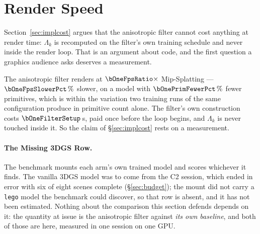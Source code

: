 \section{Render Speed}
\label{sec:fps}

Section~\ref{sec:implcost} argues that the anisotropic filter cannot cost anything at render time:
$\Lambda_k$ is recomputed on the filter's own training schedule and never inside
the render loop. That is an argument about code, and the first question a
graphics audience asks deserves a measurement.



The anisotropic filter renders at $\bOneFpsRatio\times$ Mip-Splatting --- $\bOneFpsSlowerPct\,\%$
slower, on a model with $\bOnePrimFewerPct\,\%$ fewer primitives, which is
within the variation two training runs of the same configuration produce in
primitive count alone. The filter's own construction costs $\bOneFilterSetup$\,s,
paid once before the loop begins, and $\Lambda_k$
is never touched inside it. So the claim of \S\ref{sec:implcost} rests on a measurement.

\paragraph{The Missing 3DGS Row.} The benchmark mounts each arm's own
trained model and scores whichever it finds. The vanilla 3DGS model was to come from the C2 session, which ended in error with six of eight scenes complete
(\S\ref{sec:budget}); the mount did not carry a \texttt{lego} model the
benchmark could discover, so that row is absent, and it has not been estimated. Nothing
about the comparison this section defends depends on it: the quantity at issue is
the anisotropic filter against \emph{its own baseline}, and both of those are here, measured in one
session on one GPU.


